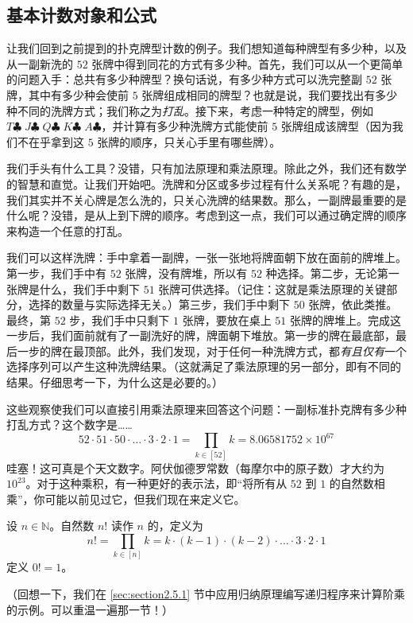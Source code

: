 
\subsection{基本计数对象和公式}

让我们回到之前提到的扑克牌型计数的例子。我们想知道每种牌型有多少种，以及从一副新洗的 $52$ 张牌中得到同花的方式有多少种。首先，我们可以从一个更简单的问题入手：总共有多少种牌型？换句话说，有多少种方式可以洗完整副 $52$ 张牌，其中有多少种会使前 $5$ 张牌组成相同的牌型？也就是说，我们要找出有多少种不同的洗牌方式；我们称之为\emph{打乱}。接下来，考虑一种特定的牌型，例如 $T\clubsuit\; J\clubsuit\; Q\clubsuit\; K\clubsuit\; A\clubsuit$，并计算有多少种洗牌方式能使前 $5$ 张牌组成该牌型（因为我们不在乎拿到这 $5$ 张牌的顺序，只关心手里有哪些牌）。

我们手头有什么工具？没错，只有加法原理和乘法原理。除此之外，我们还有数学的智慧和直觉。让我们开始吧。洗牌和分区或多步过程有什么关系呢？有趣的是，我们其实并不关心牌是怎么洗的，只关心洗牌的结果数。那么，一副牌最重要的是什么呢？没错，是从上到下牌的顺序。考虑到这一点，我们可以通过确定牌的顺序来构造一个任意的打乱。

我们可以这样洗牌：手中拿着一副牌，一张一张地将牌面朝下放在面前的牌堆上。第一步，我们手中有 $52$ 张牌，没有牌堆，所以有 $52$ 种选择。第二步，无论第一张牌是什么，我们手中剩下 $51$ 张牌可供选择。（记住：这就是乘法原理的关键部分，选择的数量与实际选择无关。）第三步，我们手中剩下 $50$ 张牌，依此类推。最终，第 $52$ 步，我们手中只剩下 $1$ 张牌，要放在桌上 $51$ 张牌的牌堆上。完成这一步后，我们面前就有了一副洗好的牌，牌面朝下堆放。第一步的牌在最底部，最后一步的牌在最顶部。此外，我们发现，对于任何一种洗牌方式，都\emph{有且仅有}一个选择序列可以产生这种洗牌结果。（这就满足了乘法原理的另一部分，即有不同的结果。仔细思考一下，为什么这是必要的。）

这些观察使我们可以直接引用乘法原理来回答这个问题：一副标准扑克牌有多少种打乱方式？这个数字是……
\[52 \cdot 51 \cdot 50 \cdot \dots \cdot 3 \cdot 2 \cdot 1 = \prod_{k \in [52]} k = 8.06581752 \times 10^{67}\]
哇塞！这可真是个天文数字。阿伏伽德罗常数（每摩尔中的原子数）才大约为 $10^{23}$。对于这种乘积，有一种更好的表示法，即``将所有从 $52$ 到 $1$ 的自然数相乘''，你可能以前见过它，但我们现在来定义它。

\begin{definition}
    设 $n \in \mathbb{N}$。自然数 $n!$ 读作 $n$ 的，定义为
    \[n! = \prod_{k \in [n]} k = k \cdot (k - 1) \cdot (k - 2) \cdot \dots \cdot 3 \cdot 2 \cdot 1\]
    定义 $0!=1$。
\end{definition}
（回想一下，我们在 \ref{sec:section2.5.1} 节中应用归纳原理编写递归程序来计算阶乘的示例。可以重温一遍那一节！）

